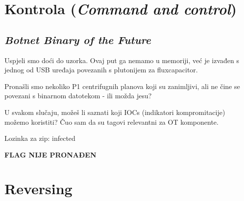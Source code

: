 \documentclass{article}
\begin{document}
\section{Kontrola (\textit{Command and control})}
\label{sec:control}
\subsection{\textit{Botnet Binary of the Future}}
\begin{tcolorbox}[
    colback=gray!5,  %
    colframe=gray!75,  %
    title=\textbf{Zadatak}]
    Uspjeli smo doći do uzorka. Ovaj put ga nemamo u memoriji, već je izvađen s jednog od USB uređaja povezanih s plutonijem za fluxcapacitor.

    Pronašli smo nekoliko P1 centrifugnih planova koji su zanimljivi, ali ne čine se povezani s binarnom datotekom - ili možda jesu?

    U svakom slučaju, možeš li saznati koji IOCs (indikatori kompromitacije) možemo koristiti? Čuo sam da su tagovi relevantni za OT komponente.

    Lozinka za zip: infected
\end{tcolorbox}

\begin{center}
    \textbf{FLAG NIJE PRONAĐEN}
\end{center}

\section{Reversing}
\label{sec:reversing}
\end{document}
